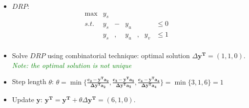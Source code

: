 \documentclass[mathserif]{beamer}
\begin{document}
{\begin{small}
\begin{itemize}
\[\]
%   
\item $DRP$:   
\[
\begin{array}{rrrrrrrrrl}
 \max & y_s   & &    \\
 s.t. & y_s &-& y_u  & &     &  \leq 0 &  \\
      & y_s &,& y_u  &,& y_v &  \leq 1 &  \\
\end{array} \nonumber
\]
  


\item  Solve $DRP$  using combinatorial technique: optimal solution  $\Delta \mathbf{y^T} = (1, 1, 0)$. \textcolor{green}{{\it Note: the optimal solution  is not unique}}

\item Step length $\theta$: $\theta = \min \{ 
\frac{ \mathbf{c_2 - y^Ta_2} }{ \mathbf{\Delta y^T a_2}  }, 
\frac{ \mathbf{c_3 - y^Ta_3} }{ \mathbf{\Delta y^T a_3}  },  
\frac{ \mathbf{c_4 - y^Ta_4} }{ \mathbf{\Delta y^T a_4}  }  
\} = \min\{ 3, 1, 6\} = 1$

\item Update $\mathbf{y}$: $\mathbf{y^T=y^T}+\theta \Delta \mathbf{y^T}  = (6, 1, 0)$. 


\end{itemize}
\end{small}}
\end{document}
